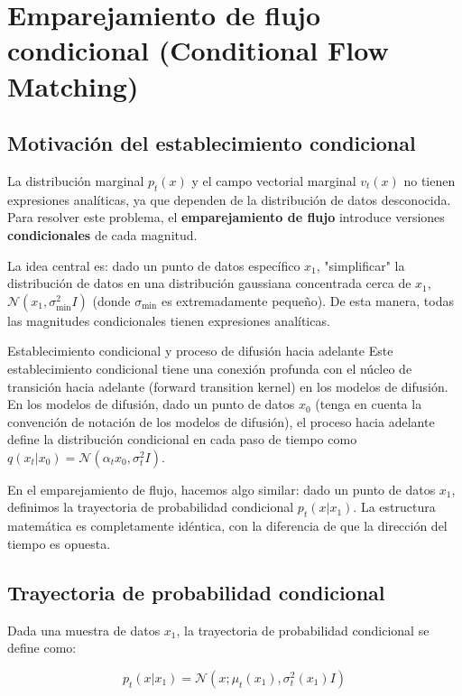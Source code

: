 \documentclass[a4paper]{article}
\begin{document}
\section{Emparejamiento de flujo condicional (Conditional Flow Matching)}

\subsection{Motivación del establecimiento condicional}

La distribución marginal $p_t(x)$ y el campo vectorial marginal $v_t(x)$ no tienen expresiones analíticas, ya que dependen de la distribución de datos desconocida. Para resolver este problema, el \textbf{emparejamiento de flujo} introduce versiones \textbf{condicionales} de cada magnitud.

La idea central es: dado un punto de datos específico $x_1$, "simplificar" la distribución de datos en una distribución gaussiana concentrada cerca de $x_1$, $\mathcal{N}(x_1, \sigma_{\min}^2 I)$ (donde $\sigma_{\min}$ es extremadamente pequeño). De esta manera, todas las magnitudes condicionales tienen expresiones analíticas.

\begin{knowledgebox}{Establecimiento condicional y proceso de difusión hacia adelante}
Este establecimiento condicional tiene una conexión profunda con el núcleo de transición hacia adelante (forward transition kernel) en los modelos de difusión. En los modelos de difusión, dado un punto de datos $x_0$ (tenga en cuenta la convención de notación de los modelos de difusión), el proceso hacia adelante define la distribución condicional en cada paso de tiempo como $q(x_t | x_0) = \mathcal{N}(\alpha_t x_0, \sigma_t^2 I)$.

En el emparejamiento de flujo, hacemos algo similar: dado un punto de datos $x_1$, definimos la trayectoria de probabilidad condicional $p_t(x | x_1)$. La estructura matemática es completamente idéntica, con la diferencia de que la dirección del tiempo es opuesta.
\end{knowledgebox}

\subsection{Trayectoria de probabilidad condicional}

Dada una muestra de datos $x_1$, la trayectoria de probabilidad condicional se define como:

$$p_t(x | x_1) = \mathcal{N}(x; \mu_t(x_1), \sigma_t^2(x_1) I)$$
\end{document}

